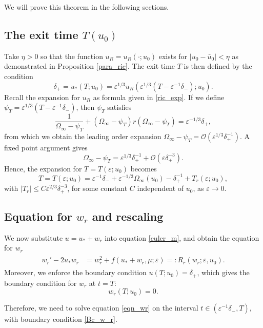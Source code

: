 \documentclass[letterpaper,11pt]{article}
\newcommand{\rmO}{\mathcal{O}}
\newcommand{\eps}{\varepsilon}
\numberwithin{equation}{section}
\theoremstyle{plain}
\begin{document}
We will prove this theorem in the following sections.
\subsection{The exit time \texorpdfstring{$T(u_0)$}{T(u_0)}}\label{exit_time}
Take $\eta>0$ so that the function $u_R = u_R(\cdot; u_0)$ exists for $|u_0-\bar{u}_0|<\eta$ as demonstrated in Proposition \ref{para_ric}. The exit time $T$ is then defined by the condition 
\[
\delta_+ = u_*(T; u_0) = \eps^{1/3}u_R(\eps^{1/3}(T-\eps^{-1}\delta_-); u_0).
\]
Recall the expansion for $u_R$ as formula given in \eqref{ric_exp}. If we define $\psi_T = \eps^{1/3}(T-\eps^{-1}\delta_-)$, then $\psi_T$ satisfies
\[
\frac{1}{\Omega_\infty-\psi_T} + (\Omega_\infty-\psi_T)r(\Omega_\infty-\psi_T) = \eps^{-1/3}\delta_+,
\]
from which we obtain the leading order expansion $\Omega_\infty-\psi_T = \rmO(\eps^{1/3}\delta_+^{-1})$. A fixed point argument gives
\[
\Omega_\infty - \psi_T = \eps^{1/3}\delta_+^{-1} + \rmO(\eps \delta_+^{-3}).
\]
Hence, the expansion for $T=T(\eps; u_0)$ becomes
\begin{equation}\label{T_exp}
T = T(\eps;u_0) = \eps^{-1}\delta_- + \eps^{-1/3}\Omega_\infty(u_0) - \delta_+^{-1} + T_r(\eps;u_0),
\end{equation}
with 
$|T_r|\le C\eps^{2/3}\delta_+^{-3}$, for some constant $C$ independent of $u_0$, as $\eps \to 0$.


\subsection{Equation for \texorpdfstring{$w_r$}{wr} and rescaling}\label{equation_wr}
We now substitute $u = u_* + w_r$ into equation \eqref{euler_m}, and obtain the equation for $w_r$
\begin{align}\label{eqn_wr}
\begin{split}
w_r' - 2u_*w_r &= w_r^2 + f(u_*+w_r, \mu; \eps) =: R_r(w_r; \eps,u_0).
\end{split}
\end{align}
Moreover, we enforce the boundary condition $u(T; u_0) = \delta_+$, which gives the boundary condition for $w_r$ at $t=T$:
\begin{equation}\label{Bc_w_r}
w_r(T;u_0) = 0.
\end{equation}

Therefore, we need to solve equation \eqref{eqn_wr} on the interval $t \in (\eps^{-1}\delta_-, T)$, with boundary condition \eqref{Bc_w_r}.
\end{document}
